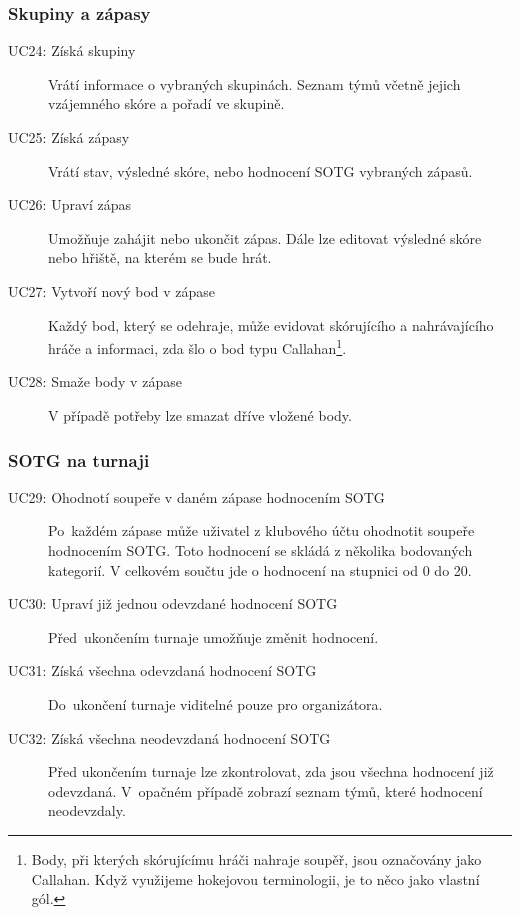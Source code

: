 \subsubsection*{Skupiny a zápasy}
  \begin{description}
    \item[UC24: Získá skupiny]
      Vrátí informace o vybraných skupinách. Seznam týmů včetně jejich vzájemného skóre a pořadí ve skupině.
    \item[UC25: Získá zápasy]
      Vrátí stav, výsledné skóre, nebo hodnocení SOTG vybraných zápasů.
    \item[UC26: Upraví zápas]
      Umožňuje zahájit nebo ukončit zápas. Dále lze editovat výsledné skóre nebo hřiště, na kterém se bude hrát.
    \item[UC27: Vytvoří nový bod v zápase]
      Každý bod, který se odehraje, může evidovat skórujícího a nahrávajícího hráče a informaci, zda šlo o bod typu Callahan\footnote{
      Body, při kterých skórujícímu hráči nahraje soupěř, jsou označovány jako Callahan.
      Když využijeme hokejovou terminologii, je to něco jako vlastní gól.}.
    \item[UC28: Smaže body v zápase]
      V případě potřeby lze smazat dříve vložené body.
  \end{description}

\subsubsection*{SOTG na turnaji}
  \begin{description}
    \item[UC29: Ohodnotí soupeře v daném zápase hodnocením SOTG]
      Po~každém zápase může uživatel z klubového účtu ohodnotit soupeře hodnocením SOTG.
      Toto hodnocení se skládá z několika bodovaných kategorií.
      V celkovém součtu jde o hodnocení na stupnici od 0 do 20.
    \item[UC30: Upraví již jednou odevzdané hodnocení SOTG]
      Před~ukončením turnaje umožňuje změnit hodnocení.
    \item[UC31: Získá všechna odevzdaná hodnocení SOTG]
      Do~ukončení turnaje viditelné pouze pro organizátora.
    \item[UC32: Získá všechna neodevzdaná hodnocení SOTG]
      Před ukončením turnaje lze zkontrolovat, zda jsou všechna hodnocení již odevzdaná.
      V~opačném případě zobrazí seznam týmů, které hodnocení neodevzdaly.
  \end{description}


